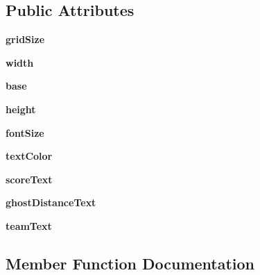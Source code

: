\subsection*{Public Attributes}
\begin{DoxyCompactItemize}
\item 
\mbox{\label{classgraphics_display_1_1_info_pane_af14473111b5ff56368287f7a15bfdc14}} 
{\bfseries grid\+Size}
\item 
\mbox{\label{classgraphics_display_1_1_info_pane_af75ef6c23a2e044eb774f646ce4e02e4}} 
{\bfseries width}
\item 
\mbox{\label{classgraphics_display_1_1_info_pane_a02a632cc3e1297c7ddde3c7e56320633}} 
{\bfseries base}
\item 
\mbox{\label{classgraphics_display_1_1_info_pane_a518daef9e46b6f2078b6b567540ccf3c}} 
{\bfseries height}
\item 
\mbox{\label{classgraphics_display_1_1_info_pane_a19caafc08967904d2e64421d3af57fdb}} 
{\bfseries font\+Size}
\item 
\mbox{\label{classgraphics_display_1_1_info_pane_a1d8dd32873451c2feca70cd83e320074}} 
{\bfseries text\+Color}
\item 
\mbox{\label{classgraphics_display_1_1_info_pane_a3747d70eea5318a757a5209649048c51}} 
{\bfseries score\+Text}
\item 
\mbox{\label{classgraphics_display_1_1_info_pane_adad53bf1ebc476ca93da22db3ad183a9}} 
{\bfseries ghost\+Distance\+Text}
\item 
\mbox{\label{classgraphics_display_1_1_info_pane_a6092e91524243ab5fdc8af69fd2cea4d}} 
{\bfseries team\+Text}
\end{DoxyCompactItemize}


\subsection{Member Function Documentation}
\mbox{\label{classgraphics_display_1_1_info_pane_a187bf3ca47cd15c70a31d389463dfc62}} 
